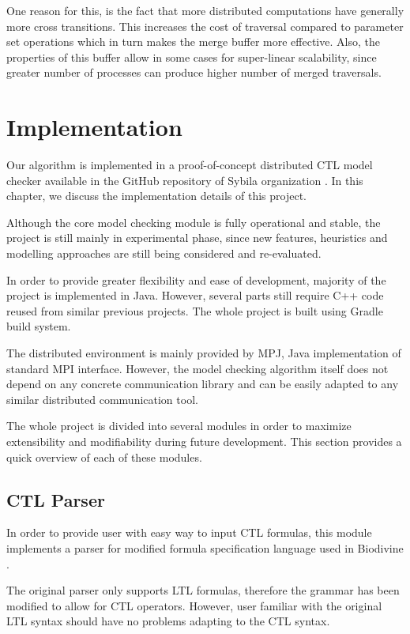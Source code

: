 \documentclass[12pt,oneside]{fithesis2}
\begin{document}
			One reason for this, is the fact that more distributed computations have generally more cross transitions. This increases the cost of traversal compared to parameter set operations which in turn makes the merge buffer more effective. Also, the properties of this buffer allow in some cases for super-linear scalability, since greater number of processes can produce higher number of merged traversals. 			
	
	\chapter{Implementation}

		Our algorithm is implemented in a proof-of-concept distributed CTL model checker available in the GitHub repository of Sybila organization \cite{github}. In this chapter, we discuss the implementation details of this project. 
		
		Although the core model checking module is fully operational and stable, the project is still mainly in experimental phase, since new features, heuristics and modelling approaches are still being considered and re-evaluated.
		
		In order to provide greater flexibility and ease of development, majority of the project is implemented in Java. However, several parts still require C++ code reused from similar previous projects. The whole project is built using Gradle build system.
			
		The distributed environment is mainly provided by MPJ, Java implementation of standard MPI interface. However, the model checking algorithm itself does not depend on any concrete communication library and can be easily adapted to any similar distributed communication tool.
			
		The whole project is divided into several modules in order to maximize extensibility and modifiability during future development. This section provides a quick overview of each of these modules.
			
		\section{CTL Parser}
			
			In order to provide user with easy way to input CTL formulas, this module implements a parser for modified formula specification language used in Biodivine \cite{biodivine}. 
				
			The original parser only supports LTL formulas, therefore the grammar has been modified to allow for CTL operators. However, user familiar with the original LTL syntax should have no problems adapting to the CTL syntax.
				
\end{document}
